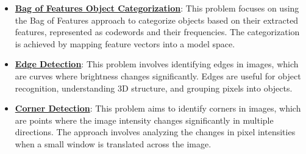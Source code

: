 \documentclass{article}%
\begin{document}
\begin{itemize}[leftmargin=*]%
\item \href{https://purdue.brightspace.com/d2l/common/assets/pdfjs-d2l-dist/1.0.14-legacy/web/viewer.html?file=\%2Fcontent\%2Fenforced\%2F1095467-wl.202510.CS.24300.001\%2F08L2-Feature Extraction.pdf\%3Fou\%3D1095467\&lang=en-us\&container=d2l-fileviewer-rendered-pdf\&fullscreen=d2l-fileviewer-rendered-pdf-dialog\&height=667#page=3}{\textbf{Bag of Features Object Categorization}}: This problem focuses on using the Bag of Features approach to categorize objects based on their extracted features, represented as codewords and their frequencies. The categorization is achieved by mapping feature vectors into a model space.%
\item \href{https://purdue.brightspace.com/d2l/common/assets/pdfjs-d2l-dist/1.0.14-legacy/web/viewer.html?file=\%2Fcontent\%2Fenforced\%2F1095467-wl.202510.CS.24300.001\%2F08L2-Feature Extraction.pdf\%3Fou\%3D1095467\&lang=en-us\&container=d2l-fileviewer-rendered-pdf\&fullscreen=d2l-fileviewer-rendered-pdf-dialog\&height=667#page=4}{\textbf{Edge Detection}}: This problem involves identifying edges in images, which are curves where brightness changes significantly. Edges are useful for object recognition, understanding 3D structure, and grouping pixels into objects.%
\item \href{https://purdue.brightspace.com/d2l/common/assets/pdfjs-d2l-dist/1.0.14-legacy/web/viewer.html?file=\%2Fcontent\%2Fenforced\%2F1095467-wl.202510.CS.24300.001\%2F08L2-Feature Extraction.pdf\%3Fou\%3D1095467\&lang=en-us\&container=d2l-fileviewer-rendered-pdf\&fullscreen=d2l-fileviewer-rendered-pdf-dialog\&height=667#page=20}{\textbf{Corner Detection}}: This problem aims to identify corners in images, which are points where the image intensity changes significantly in multiple directions. The approach involves analyzing the changes in pixel intensities when a small window is translated across the image.%
\end{itemize}%
\end{document}
